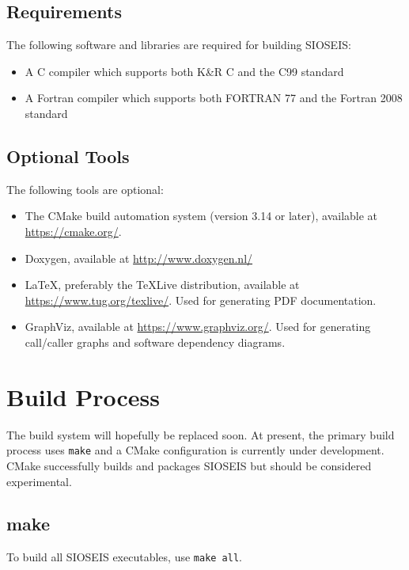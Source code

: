 \section{Requirements}
The following software and libraries are required for building SIOSEIS:

\begin{itemize}
    \item A C compiler which supports both K\&R C and the C99 standard
    \item A Fortran compiler which supports both FORTRAN 77 and the Fortran 2008 standard
\end{itemize}

\section{Optional Tools}
The following tools are optional:

\begin{itemize}
    \item The CMake build automation system (version 3.14 or later), available at \url{https://cmake.org/}.
    \item Doxygen, available at \url{http://www.doxygen.nl/}
    \item LaTeX, preferably the TeXLive distribution, available at \url{https://www.tug.org/texlive/}. Used for generating PDF documentation.
    \item GraphViz, available at \url{https://www.graphviz.org/}. Used for generating call/caller graphs and software dependency diagrams.
\end{itemize}

\chapter{Build Process}

The build system will hopefully be replaced soon. At present, the primary build
process uses \texttt{make} and a CMake configuration is currently under
development. CMake successfully builds and packages SIOSEIS but should be
considered experimental.

\section{make}

To build all SIOSEIS executables, use \texttt{make all}.

